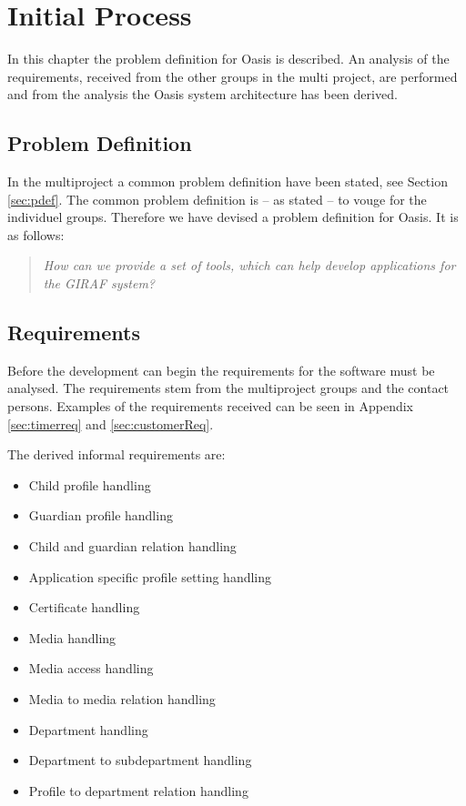 \chapter{Initial Process}
In this chapter the problem definition for Oasis is described.
An analysis of the requirements, received from the other groups in the multi project, are performed and from the analysis the Oasis system architecture has been derived.

\section{Problem Definition}
In the multiproject a common problem definition have been stated, see Section \vref{sec:pdef}. The common problem definition is -- as stated -- to vouge for the individuel groups. Therefore we have devised a problem definition for Oasis.
It is as follows:

\begin{quotation}
	\textit{How can we provide a set of tools, which can help develop applications for the GIRAF system?}
\end{quotation}

\section{Requirements}
Before the development can begin the requirements for the software must be analysed.
The requirements stem from the multiproject groups and the contact persons.
Examples of the requirements received can be seen in Appendix \vref{sec:timerreq} and \vref{sec:customerReq}.

The derived informal requirements are:
\begin{itemize}
	\item Child profile handling
	\item Guardian profile handling
	\item Child and guardian relation handling
	\item Application specific profile setting handling
	\item Certificate handling
	\item Media handling
	\item Media access handling
	\item Media to media relation handling
	\item Department handling
	\item Department to subdepartment handling
	\item Profile to department relation handling
\end{itemize}

